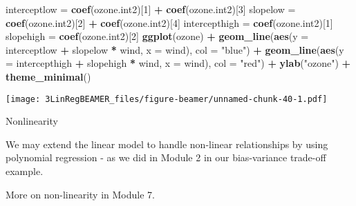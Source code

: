 \documentclass[ignorenonframetext,]{beamer}
\newenvironment{Shaded}{\begin{snugshade}}{\end{snugshade}}
\newcommand{\KeywordTok}[1]{\textcolor[rgb]{0.13,0.29,0.53}{\textbf{#1}}}
\newcommand{\DataTypeTok}[1]{\textcolor[rgb]{0.13,0.29,0.53}{#1}}
\newcommand{\DecValTok}[1]{\textcolor[rgb]{0.00,0.00,0.81}{#1}}
\newcommand{\StringTok}[1]{\textcolor[rgb]{0.31,0.60,0.02}{#1}}
\newcommand{\OperatorTok}[1]{\textcolor[rgb]{0.81,0.36,0.00}{\textbf{#1}}}
\newcommand{\NormalTok}[1]{#1}
\begin{document}
\begin{frame}[fragile]

\footnotesize

\begin{Shaded}
\begin{Highlighting}[]
\NormalTok{interceptlow =}\StringTok{ }\KeywordTok{coef}\NormalTok{(ozone.int2)[}\DecValTok{1}\NormalTok{] }\OperatorTok{+}\StringTok{ }\KeywordTok{coef}\NormalTok{(ozone.int2)[}\DecValTok{3}\NormalTok{]}
\NormalTok{slopelow =}\StringTok{ }\KeywordTok{coef}\NormalTok{(ozone.int2)[}\DecValTok{2}\NormalTok{] }\OperatorTok{+}\StringTok{ }\KeywordTok{coef}\NormalTok{(ozone.int2)[}\DecValTok{4}\NormalTok{]}
\NormalTok{intercepthigh =}\StringTok{ }\KeywordTok{coef}\NormalTok{(ozone.int2)[}\DecValTok{1}\NormalTok{]}
\NormalTok{slopehigh =}\StringTok{ }\KeywordTok{coef}\NormalTok{(ozone.int2)[}\DecValTok{2}\NormalTok{]}
\KeywordTok{ggplot}\NormalTok{(ozone) }\OperatorTok{+}\StringTok{ }\KeywordTok{geom_line}\NormalTok{(}\KeywordTok{aes}\NormalTok{(}\DataTypeTok{y =}\NormalTok{ interceptlow }\OperatorTok{+}\StringTok{ }\NormalTok{slopelow }\OperatorTok{*}\StringTok{ }\NormalTok{wind, }\DataTypeTok{x =}\NormalTok{ wind), }
    \DataTypeTok{col =} \StringTok{"blue"}\NormalTok{) }\OperatorTok{+}\StringTok{ }\KeywordTok{geom_line}\NormalTok{(}\KeywordTok{aes}\NormalTok{(}\DataTypeTok{y =}\NormalTok{ intercepthigh }\OperatorTok{+}\StringTok{ }\NormalTok{slopehigh }\OperatorTok{*}\StringTok{ }\NormalTok{wind, }
    \DataTypeTok{x =}\NormalTok{ wind), }\DataTypeTok{col =} \StringTok{"red"}\NormalTok{) }\OperatorTok{+}\StringTok{ }\KeywordTok{ylab}\NormalTok{(}\StringTok{"ozone"}\NormalTok{) }\OperatorTok{+}\StringTok{ }\KeywordTok{theme_minimal}\NormalTok{()}
\end{Highlighting}
\end{Shaded}

\texttt{[image: 3LinRegBEAMER\_files/figure-beamer/unnamed-chunk-40-1.pdf]}

\normalsize

\end{frame}

\begin{frame}

\begin{block}{Nonlinearity}

We may extend the linear model to handle non-linear relationships by
using polynomial regression - as we did in Module 2 in our bias-variance
trade-off example.

More on non-linearity in Module 7.

\end{block}

\end{frame}
\end{document}
